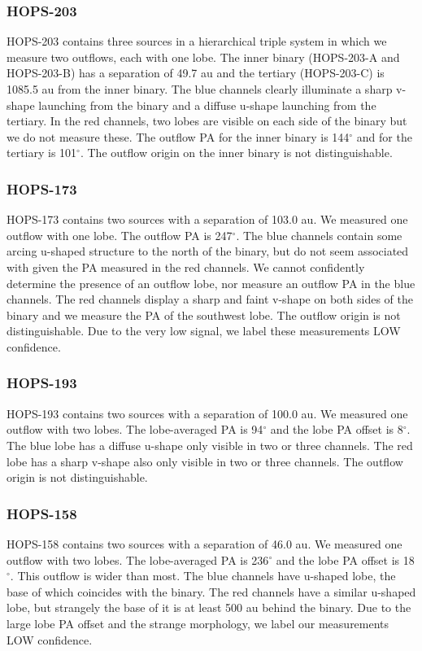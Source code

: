 \documentclass[linenumbers,twocolumn, twocolappendix]{aastex631}
\begin{document}
\subsubsection{HOPS-203}
HOPS-203 contains three sources in a hierarchical triple system in which we measure two outflows, each with one lobe. The inner binary (HOPS-203-A and HOPS-203-B) has a separation of 49.7 au and the tertiary (HOPS-203-C) is 1085.5 au from the inner binary. The blue channels clearly illuminate a sharp v-shape launching from the binary and a diffuse u-shape launching from the tertiary. In the red channels, two lobes are visible on each side of the binary but we do not measure these. The outflow PA for the inner binary is 144$^\circ$ and for the tertiary is 101$^\circ$. The outflow origin on the inner binary is not distinguishable.

\subsubsection{HOPS-173}
HOPS-173 contains two sources with a separation of 103.0 au. We measured one outflow with one lobe. The outflow PA is 247$^\circ$. The blue channels contain some arcing u-shaped structure to the north of the binary, but do not seem associated with given the PA measured in the red channels. We cannot confidently determine the presence of an outflow lobe, nor measure an outflow PA in the blue channels. The red channels display a sharp and faint v-shape on both sides of the binary and we measure the PA of the southwest lobe. The outflow origin is not distinguishable. Due to the very low signal, we label these measurements LOW confidence.

\subsubsection{HOPS-193}
HOPS-193 contains two sources with a separation of 100.0 au. We measured one outflow with two lobes. The lobe-averaged PA is 94$^\circ$ and the lobe PA offset is 8$^\circ$. The blue lobe has a diffuse u-shape only visible in two or three channels. The red lobe has a sharp v-shape also only visible in two or three channels. The outflow origin is not distinguishable.

\subsubsection{HOPS-158}
HOPS-158 contains two sources with a separation of 46.0 au. We measured one outflow with two lobes. The lobe-averaged PA is 236$^\circ$ and the lobe PA offset is 18$^\circ$. This outflow is wider than most. The blue channels have u-shaped lobe, the base of which coincides with the binary. The red channels have a similar u-shaped lobe, but strangely the base of it is at least 500 au behind the binary. Due to the large lobe PA offset and the strange morphology, we label our measurements LOW confidence.
\end{document}
